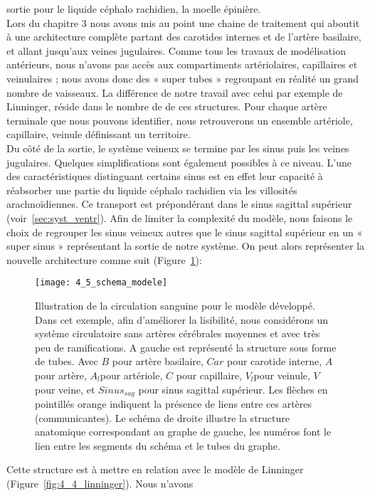 sortie pour le liquide céphalo rachidien, la moelle épinière.\\
Lors du chapitre 3 nous avons mis au point une chaine de traitement qui aboutit à une
architecture complète partant des carotides internes et de l’artère basilaire, et allant jusqu’aux veines
jugulaires. Comme tous les travaux de modélisation antérieurs, nous n’avons pas accès aux
compartiments artériolaires, capillaires et veinulaires ; nous avons donc des « super tubes »
regroupant en réalité un grand nombre de vaisseaux. La différence de notre travail avec celui par
exemple de Linninger, réside dans le nombre de de ces structures. Pour chaque artère terminale que
nous pouvons identifier, nous retrouverons un ensemble artériole, capillaire, veinule définissant un
territoire.\\
Du côté de la sortie, le système veineux se termine par les sinus puis les veines jugulaires.
Quelques simplifications sont également possibles à ce niveau. L’une des caractéristiques distinguant
certains sinus est en effet leur capacité à réabsorber une partie du liquide céphalo rachidien via les
villosités arachnoïdiennes. Ce transport est prépondérant dans le sinus sagittal supérieur (voir~\ref{sec:syst_ventr}). Afin de limiter la complexité du modèle, nous faisons le choix de regrouper les sinus veineux autres
que le sinus sagittal supérieur en un « super sinus » représentant la sortie de notre système. On peut
alors représenter la nouvelle architecture comme suit (Figure~\ref{fig:4_5_schema_modele}):
\begin{figure}[!t]
\centering
\texttt{[image: 4\_5\_schema\_modele]}
\caption{Illustration de la circulation sanguine pour le modèle développé. Dans cet exemple, afin d’améliorer la lisibilité,
nous considérons un système circulatoire sans artères cérébrales moyennes et avec très peu de ramifications. A gauche est
représenté la structure sous forme de tubes. Avec $B$ pour artère basilaire, $Car$ pour carotide interne, $A$ pour artère, $A_l $pour
artériole, $C$ pour capillaire, $V_l $pour veinule, $V$ pour veine, et $Sinus_{sag}$ pour sinus sagittal supérieur. Les flèches en pointillés
orange indiquent la présence de liens entre ces artères (communicantes). Le schéma de droite illustre la structure
anatomique correspondant au graphe de gauche, les numéros font le lien entre les segments du schéma et le tubes du
graphe.
}
\label{fig:4_5_schema_modele}	
\end{figure}
Cette structure est à mettre en relation avec le modèle de Linninger (Figure~\ref{fig:4_4_linninger}). Nous n’avons
